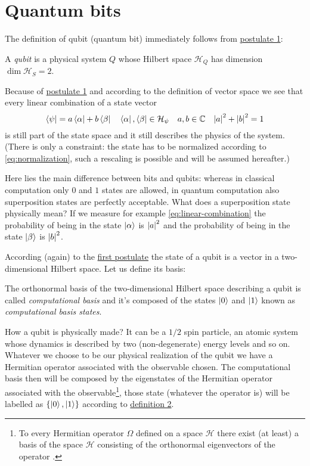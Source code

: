 \section{Quantum bits}
The definition of qubit (quantum bit) immediately follows from \hyperref[postulate:1]{postulate 1}:
\begin{defn}
A \emph{qubit} is a physical system $Q$ whose Hilbert space $\mathcal{H}_Q$ has dimension $\dim\mathcal{H}_S = 2$.
\end{defn}
Because of \hyperref[postulate:1]{postulate 1} and according to the definition of vector space we see that every linear combination of a state vector
\begin{equation}\label{eq:linear-combination}
    \bra{\psi} = a \bra{\alpha} + b \bra{\beta} \quad \bra{\alpha},\bra{\beta} \in \mathcal{H}_\psi \quad a,b \in \mathbb{C} \quad \abs*{a}^2 + \abs*{b}^2 = 1
\end{equation}
is still part of the state space and it still describes the physics of the system. (There is only a constraint: the state has to be normalized according to \eqref{eq:normalization}, such a rescaling is possible and will be assumed hereafter.) 


Here lies the main difference between bits and qubits: whereas in classical computation only $0$ and $1$ states are allowed, in quantum computation also superposition states are perfectly acceptable. 
What does a superposition state physically mean? If we measure for example \eqref{eq:linear-combination} the probability of being in the state $\ket{\alpha}$ is  $\abs*{a}^2$ and the probability of being in the state $\ket{\beta}$ is $\abs*{b}^2$.

According (again) to the \hyperref[postulate:1]{first postulate} the state of a qubit is a vector in a two-dimensional Hilbert space. Let us define its basis:
\begin{defn}\label{def:computational-basis}
The orthonormal basis of the two-dimensional Hilbert space describing a qubit is called \emph{computational basis} and it's composed of the states $\ket{0}$ and $\ket{1}$ known as \emph{computational basis states}.
\end{defn}
How a qubit is physically made?
It can be a $1/2$ spin particle, an atomic system whose dynamics is described by two (non-degenerate) energy levels and so on.
Whatever we choose to be our physical realization of the qubit we have a Hermitian operator associated with the observable chosen. The computational basis then will be composed by the eigenstates of the Hermitian operator associated with the observable\footnote{To every Hermitian operator $\Omega$ defined on a space $\mathcal{H}$ there exist (at least) a basis of the space $\mathcal{H}$ consisting of the orthonormal eigenvectors of the operator \cite[36]{Shankar}.}, those state (whatever the operator is) will be labelled as $\{\ket{0},\ket{1}\}$ according to \hyperref[def:computational-basis]{definition 2}.



